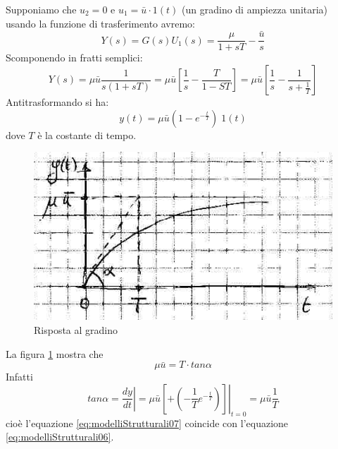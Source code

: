 \documentclass[a4paper]{report}
\begin{document}
Supponiamo che $u_2 = 0$ e $u_1 = \bar{u} \cdot 1(t)$ (un gradino di
ampiezza unitaria) usando la funzione di trasferimento avremo:
\begin{equation}\label{eq:modelliStrutturali04}
  Y(s) = G(s) U_1(s) = \dfrac{\mu}{1 + s T} - \dfrac{\bar{u}}{s}
\end{equation}
Scomponendo in fratti semplici:
\[
Y(s) = \mu \bar{u} \dfrac{1}{s(1 + sT)} = \mu \bar{u} \left [ \dfrac{1}{s}
- \dfrac{T}{1 - ST} \right] = \mu \bar{u} \left [ \dfrac{1}{s} -
  \dfrac{1}{s + \frac{1}{T}} \right ]
\]
Antitrasformando si ha:
\begin{equation}\label{eq:modelliStrutturali05}
  y(t) = \mu \bar{u} (1 - e^{-\frac{t}{T}}) \; 1(t)
\end{equation}
dove $T$ \`e la costante di tempo.
\begin{figure}[!hbp]
  \begin{center}
    \includegraphics[scale=0.5]{./figures/modelliStrutturali03.png}
    \caption{Risposta al gradino}
    \label{fig:modelliStrutturali03}
  \end{center}
\end{figure}
La figura \ref{fig:modelliStrutturali03} mostra che
\begin{equation}\label{eq:modelliStrutturali06}
  \mu\bar{u} = T \cdot tan\alpha
\end{equation}
Infatti
\begin{equation}\label{eq:modelliStrutturali07}
  tan \alpha = \left . \dfrac{dy}{dt} \right | = \mu \bar{u} \left . \left [ +
    ( - \dfrac{1}{T} e^{-\frac{t}{T}})\right] \right |_{t = 0} = \mu
  \bar{u} \dfrac{1}{T}
\end{equation}
cio\`e l'equazione \ref{eq:modelliStrutturali07} coincide con
l'equazione \ref{eq:modelliStrutturali06}.
\end{document}
